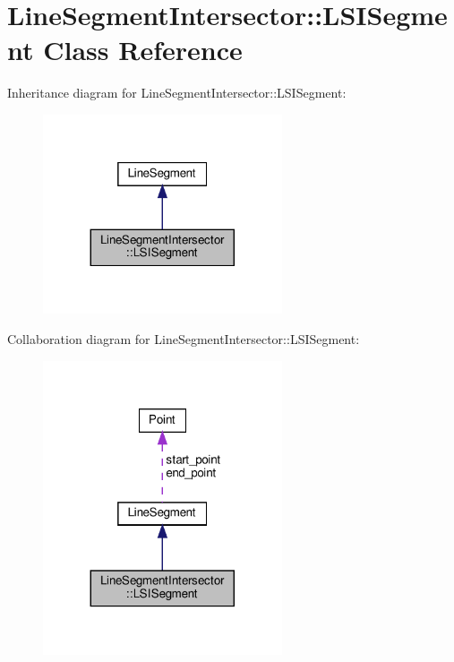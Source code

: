 \hypertarget{classLineSegmentIntersector_1_1LSISegment}{}\section{Line\+Segment\+Intersector\+:\+:L\+S\+I\+Segment Class Reference}
\label{classLineSegmentIntersector_1_1LSISegment}


Inheritance diagram for Line\+Segment\+Intersector\+:\+:L\+S\+I\+Segment\+:
\nopagebreak
\begin{figure}[H]
\begin{center}
\leavevmode
\includegraphics[width=200pt]{classLineSegmentIntersector_1_1LSISegment__inherit__graph}
\end{center}
\end{figure}


Collaboration diagram for Line\+Segment\+Intersector\+:\+:L\+S\+I\+Segment\+:
\nopagebreak
\begin{figure}[H]
\begin{center}
\leavevmode
\includegraphics[width=200pt]{classLineSegmentIntersector_1_1LSISegment__coll__graph}
\end{center}
\end{figure}
